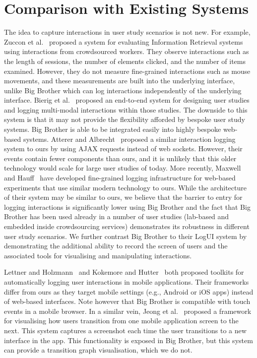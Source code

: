 \vspace{-16pt}
\section{Comparison with Existing Systems}

The idea to capture interactions in user study scenarios is not new. For example, Zuccon et al.~\cite{zuccon2013crowdsourcing} proposed a system for evaluating Information Retrieval systems using interactions from crowdsourced workers. They observe interactions such as the length of sessions, the number of elements clicked, and the number of items examined. However, they do not measure fine-grained interactions such as mouse movements, and these measurements are built into the underlying interface, unlike Big Brother which can log interactions independently of the underlying interface. Bierig et al.~\cite{bierig2009user} proposed an end-to-end system for designing user studies and logging multi-modal interactions within those studies. The downside to this system is that it may not provide the flexibility afforded by bespoke user study systems. Big Brother is able to be integrated easily into highly bespoke web-based systems. Atterer and Albrecht~\cite{atterer2007tracking} proposed a similar interaction logging system to ours by using AJAX requests instead of web sockets. However, their events contain fewer components than ours, and it is unlikely that this older technology would scale for large user studies of today. More recently, Maxwell and Hauff~\cite{maxwell2021logui} have developed fine-grained logging infrastructure for web-based experiments that use similar modern technology to ours. While the architecture of their system may be similar to ours, we believe that the barrier to entry for logging interactions is significantly lower using Big Brother and the fact that Big Brother has been used already in a number of user studies (lab-based and embedded inside crowdsourcing services) demonstrates its robustness in different user study scenarios. We further contrast Big Brother to their LogUI system by demonstrating the additional ability to record the screen of users and the associated tools for visualising and manipulating interactions.

Lettner and Holzmann~\cite{lettner2012automated} and Kokemore and Hutter~\cite{kokemor2016aspect} both proposed toolkits for automatically logging user interactions in mobile applications. Their frameworks differ from ours as they target mobile settings (e.g., Android or iOS apps) instead of web-based interfaces. Note however that Big Brother is compatible with touch events in a mobile browser. In a similar vein, Jeong et al.~\cite{jeong2020gui} proposed a framework for visualising how users transition from one mobile application screen to the next. This system captures a screenshot each time the user transitions to a new interface in the app. This functionality is exposed in Big Brother, but this system can provide a transition graph visualisation, which we do not. 